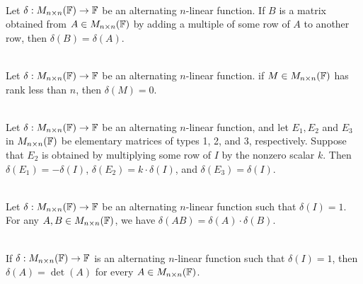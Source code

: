 \begin{corollary}
	\hfill\\
	Let $\delta: M_{n \times n}(\mathbb{F}) \to \mathbb{F}$ be an alternating $n$-linear function. If $B$ is a matrix obtained from $A \in M_{n \times n}(\mathbb{F})$ by adding a multiple of some row of $A$ to another row, then $\delta(B) = \delta(A)$.
\end{corollary}

\begin{corollary}
	\hfill\\
	Let $\delta: M_{n \times n}(\mathbb{F}) \to \mathbb{F}$ be an alternating $n$-linear function. if $M \in M_{n \times n}(\mathbb{F})$ has rank less than $n$, then $\delta(M) = 0$.
\end{corollary}

\begin{corollary}
	\hfill\\
	Let $\delta: M_{n \times n}(\mathbb{F}) \to \mathbb{F}$ be an alternating $n$-linear function, and let $E_1, E_2$ and $E_3$ in $M_{n \times n}(\mathbb{F})$ be elementary matrices of types 1, 2, and 3, respectively. Suppose that $E_2$ is obtained by multiplying some row of $I$ by the nonzero scalar $k$. Then $\delta(E_1) = -\delta(I)$, $\delta(E_2) = k \cdot \delta(I)$, and $\delta(E_3) = \delta(I)$.
\end{corollary}

\begin{theorem}
	\hfill\\
	Let $\delta: M_{n \times n}(\mathbb{F}) \to \mathbb{F}$ be an alternating $n$-linear function such that $\delta(I) = 1$. For any $A,B \in M_{n \times n}(\mathbb{F})$, we have $\delta(AB) = \delta(A) \cdot \delta(B)$.
\end{theorem}

\begin{theorem}
	\hfill\\
	If $\delta: M_{n \times n}(\mathbb{F}) \to \mathbb{F}$ is an alternating $n$-linear function such that $\delta(I) = 1$, then $\delta(A) = \det(A)$ for every $A \in M_{n \times n}(\mathbb{F})$.
\end{theorem}
